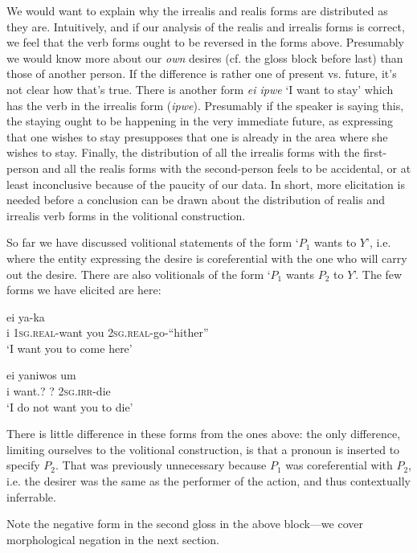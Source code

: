 \documentclass[pdftex,12pt,letterpaper]{article}
\let\ipa\textipa
\begin{document}
 We would want to explain why the irrealis and realis forms are distributed as they are. Intuitively, and if our analysis of the realis and irrealis forms is correct, we feel that the verb forms ought to be reversed in the forms above. Presumably we would know more about our \emph{own} desires (cf. the gloss block before last) than those of another person. If the difference is rather one of present vs. future, it's not clear how that's true. There is another form \emph{ei \ipa{y@ka} ipwe} `I want to stay' which has the verb in the irrealis form (\emph{ipwe}). Presumably if the speaker is saying this, the staying ought to be happening in the very immediate future, as expressing that one wishes to stay presupposes that one is already in the area where she wishes to stay. Finally, the distribution of all the irrealis forms with the first-person and all the realis forms with the second-person feels to be accidental, or at least inconclusive because of the paucity of our data. In short, more elicitation is needed before a conclusion can be drawn about the distribution of realis and irrealis verb forms in the volitional construction.
 
 So far we have discussed volitional statements of the form `$P_1$ wants to $Y$', i.e. where the entity expressing the desire is coreferential with the one who will carry out the desire. There are also volitionals of the form `$P_1$ wants $P_2$ to $Y$'. The few forms we have elicited are here:
 
 \begin{exe}
 \ex
 \gll ei ya-ka \ipa{\textltailn@} \ipa{\textltailn@-nak-i} \\
 i \textsc{1sg.real}-want you \textsc{2sg.real}-go-``hither'' \\
 \trans `I want you to come here'
 
 \ex
 \gll ei yaniwos um \ipa{\textltailn@} \ipa{\textltailn u-g@k} \\
 i want.? ? \textsc{2sg.irr}-die \\
 \trans `I do not want you to die'
 \end{exe}

\noindent There is little difference in these forms from the ones above: the only difference, limiting ourselves to the volitional construction, is that a pronoun is inserted to specify $P_2$. That was previously unnecessary because $P_1$ was coreferential with $P_2$, i.e. the desirer was the same as the performer of the action, and thus contextually inferrable.

Note the negative form in the second gloss in the above block---we cover morphological negation in the next section.
\end{document}
